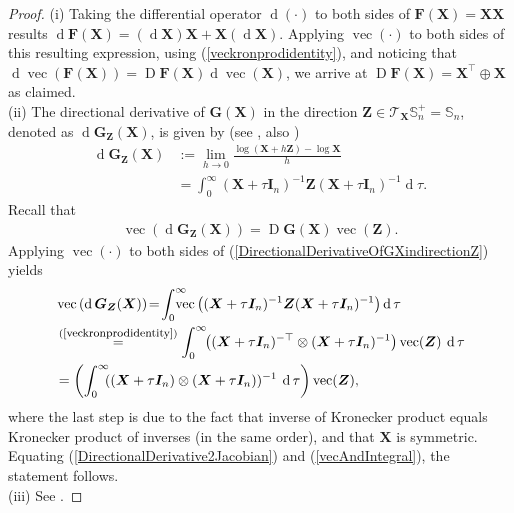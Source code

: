 \documentclass[letterpaper,10pt,twocolumn,conference]{ieeeconf}
\newcommand{\bbI}{\bm{I}}
\newcommand{\bbF}{\bm{F}}
\newcommand{\bbG}{\bm{G}}
\newcommand{\bbX}{\bm{X}}
\newcommand{\bbZ}{\bm{Z}}
\newcommand{\Jacobian}{\operatorname{D}}
\newcommand{\differential}{\operatorname{d}}
\renewcommand{\vec}{\operatorname{vec}}
\begin{document}
\begin{proof}
(i) Taking the differential operator $\differential(\cdot)$ to both sides of $\bbF(\bbX) = \bbX\bbX$ results $\differential\bbF(\bbX) = (\differential\bbX)\bbX + \bbX(\differential\bbX)$. Applying $\vec(\cdot)$ to both sides of this resulting expression, using (\ref{veckronprodidentity}), and noticing that $\differential\vec(\bbF(\bbX))= \Jacobian\bbF(\bbX)\differential\vec(\bbX)$, we arrive at $\Jacobian\bbF(\bbX) = \bbX^{\top} \oplus \bbX$ as claimed. 
\\
(ii) The directional derivative of $\bbG(\bbX)$ in the direction $\bbZ\in\mathcal{T}_{\bbX}\mathbb{S}_{n}^{+} = \mathbb{S}_{n}$, denoted as $\differential\bbG_{\bbZ}(\bbX)$, is given by (see \cite[Section 3.1]{Ruskai2005}, also \cite[Appendix I.B]{TryphonTIT2006})
\begin{align}
\differential\bbG_{\bbZ}(\bbX) &:= \displaystyle\lim_{h\rightarrow 0} \displaystyle\frac{\log\left(\bbX + h\bbZ\right) - \log\bbX}{h}\nonumber\\
&= \displaystyle\int_{0}^{\infty}(\bbX + \tau\bbI_{n})^{-1}\bbZ(\bbX + \tau\bbI_{n})^{-1}\differential\tau.  
\label{DirectionalDerivativeOfGXindirectionZ}	
\end{align}
Recall that
\begin{eqnarray}
\vec\left(\differential\bbG_{\bbZ}(\bbX)\right) = \Jacobian\bbG(\bbX)\vec(\bbZ) \label{DirectionalDerivative2Jacobian}.	
\end{eqnarray}
Applying $\vec(\cdot)$ to both sides of (\ref{DirectionalDerivativeOfGXindirectionZ}) yields
\begin{align}
&\vec\left(\differential\bbG_{\bbZ}(\bbX)\right) \!= \!\displaystyle\int_{0}^{\infty}\!\!\!\!\!\! \vec\left((\bbX + \tau\bbI_{n})^{-1}\bbZ(\bbX + \tau\bbI_{n})^{-1}\right) \differential\tau 	\nonumber\\
&\stackrel{\footnotesize{(\ref{veckronprodidentity})}}{=}  \int_{0}^{\infty}\!\!\left((\bbX + \tau\bbI_{n})^{-\top} \otimes (\bbX + \tau\bbI_{n})^{-1}\right)\vec(\bbZ)\:\differential\tau \nonumber\\
&= \left(\int_{0}^{\infty}\!\!((\bbX + \tau\bbI_{n}) \otimes (\bbX + \tau\bbI_{n}))^{-1}\:\differential\tau\right)\vec(\bbZ),
\label{vecAndIntegral}
\end{align} 
where the last step is due to the fact that inverse of Kronecker product equals Kronecker product of inverses (in the same order), and that $\bbX$ is symmetric. Equating (\ref{DirectionalDerivative2Jacobian}) and (\ref{vecAndIntegral}), the statement follows.
\\
(iii) See \cite[Appendix A, Lemma 3]{HalderWendelACC2016}.	
\end{proof}
\end{document}
